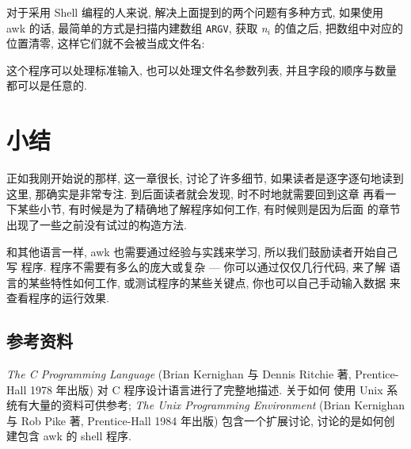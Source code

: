 对于采用 Shell 编程的人来说, 解决上面提到的两个问题有多种方式, 如果使用 
awk 的话, 最简单的方式是扫描内建数组 \verb'ARGV', 获取 \textit{n}$_i$
的值之后, 把数组中对应的位置清零, 这样它们就不会被当成文件名:
这个程序可以处理标准输入, 也可以处理文件名参数列表, 并且字段的顺序与数量
都可以是任意的.

\section{小结}
\label{sec:the_awk_language_summary}

正如我刚开始说的那样, 这一章很长, 讨论了许多细节, 如果读者是逐字逐句地读到
这里, 那确实是非常专注. 到后面读者就会发现, 时不时地就需要回到这章
再看一下某些小节, 有时候是为了精确地了解程序如何工作, 有时候则是因为后面
的章节出现了一些之前没有试过的构造方法.

和其他语言一样, awk 也需要通过经验与实践来学习, 所以我们鼓励读者开始自己写
程序. 程序不需要有多么的庞大或复杂 --- 你可以通过仅仅几行代码, 来了解
语言的某些特性如何工作, 或测试程序的某些关键点, 你也可以自己手动输入数据
来查看程序的运行效果.

\subsection*{参考资料}
\label{subsec:bibliographic_notes}

\textit{The C Programming Language} (Brian Kernighan 与 Dennis Ritchie 著,
Prentice-Hall 1978 年出版) 对 C 程序设计语言进行了完整地描述. 关于如何 
使用 Unix 系统有大量的资料可供参考; \textit{The Unix Programming 
Environment} (Brian Kernighan 与 Rob Pike 著, Prentice-Hall 1984 年出版)
包含一个扩展讨论, 讨论的是如何创建包含 awk 的 shell 程序.
